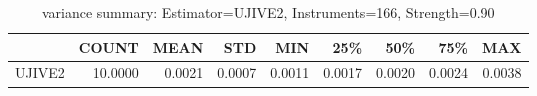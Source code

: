 \begin{table}[ht]
\centering
\caption{variance summary: Estimator=UJIVE2, Instruments=166, Strength=0.90}
\begin{tabular}{lrrrrrrrr}
\toprule
 & COUNT & MEAN & STD & MIN & 25\% & 50\% & 75\% & MAX \\
\midrule
UJIVE2 & 10.0000 & 0.0021 & 0.0007 & 0.0011 & 0.0017 & 0.0020 & 0.0024 & 0.0038 \\
\bottomrule
\end{tabular}
\end{table}
